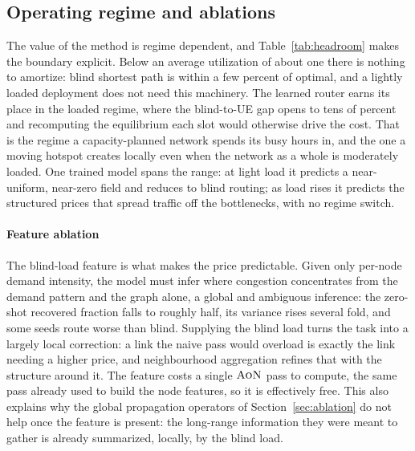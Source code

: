 \documentclass[journal]{IEEEtran}
\newcommand{\AoN}{\textsc{AoN}}
\begin{document}
\subsection{Operating regime and ablations}\label{sec:regime}
The value of the method is regime dependent, and Table~\ref{tab:headroom} makes the boundary explicit. Below an average utilization of about one there is nothing to amortize: blind shortest path is within a few percent of optimal, and a lightly loaded deployment does not need this machinery. The learned router earns its place in the loaded regime, where the blind-to-UE gap opens to tens of percent and recomputing the equilibrium each slot would otherwise drive the cost. That is the regime a capacity-planned network spends its busy hours in, and the one a moving hotspot creates locally even when the network as a whole is moderately loaded. One trained model spans the range: at light load it predicts a near-uniform, near-zero field and reduces to blind routing; as load rises it predicts the structured prices that spread traffic off the bottlenecks, with no regime switch.

\paragraph{Feature ablation}\label{sec:ablate-feat}
The blind-load feature is what makes the price predictable. Given only per-node demand intensity, the model must infer where congestion concentrates from the demand pattern and the graph alone, a global and ambiguous inference: the zero-shot recovered fraction falls to roughly half, its variance rises several fold, and some seeds route worse than blind. Supplying the blind load turns the task into a largely local correction: a link the naive pass would overload is exactly the link needing a higher price, and neighbourhood aggregation refines that with the structure around it. The feature costs a single $\AoN$ pass to compute, the same pass already used to
build the node features, so it is effectively free. This also explains why the global
propagation operators of Section~\ref{sec:ablation} do not help once the feature is present:
the long-range information they were meant to gather is already summarized, locally, by the
blind load.
\end{document}
